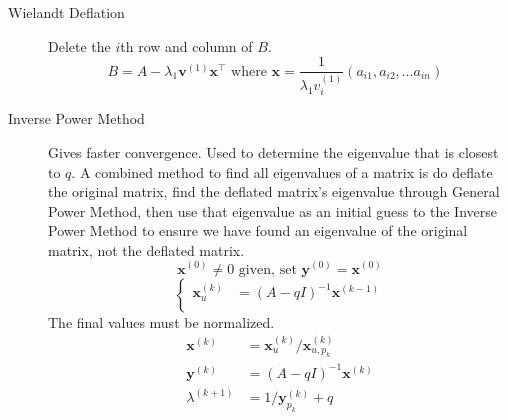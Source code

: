 \documentclass[8pt]{article}
\begin{document}
\begin{multicols}{2}
\begin{description}
  \item[Wielandt Deflation] Delete the $i$th row and column of $B$.
    \begin{equation*}
      B=A-\lambda_1\mathbf{v}^{(1)}\mathbf{x}^\top 
      \text{ where } \mathbf{x}=\frac{1}{\lambda_1 v^{(1)}_i}(a_{i1}, a_{i2}, \ldots a_{in}) 
      \text{ }
    \end{equation*}
  \item[Inverse Power Method] Gives faster convergence. Used to determine the eigenvalue that is
    closest to $q$. A combined method to find all eigenvalues of a matrix is do deflate the original
    matrix, find the deflated matrix's eigenvalue through General Power Method, then use that
    eigenvalue as an initial guess to the Inverse Power Method to ensure we have found an eigenvalue
    of the original matrix, not the deflated matrix.
    $$\mathbf{x}^{(0)} \neq 0 \text{ given, set } \mathbf{y}^{(0)}=\mathbf{x}^{(0)}$$
    \begin{equation*}
      \left\{
        \begin{aligned}
          \mathbf{x}^{(k)}_u &= (A-qI)^{-1}\mathbf{x}^{(k-1)} \\
        \end{aligned}
      \right.
    \end{equation*}
        The final values must be normalized.
    \begin{equation*}
        \begin{aligned}
          \mathbf{x}^{(k)} &= \mathbf{x}^{(k)}_u/\mathbf{x}^{(k)}_{u,p_k} \\
          \mathbf{y}^{(k)} &= (A-qI)^{-1}\mathbf{x}^{(k)} \\
          \lambda^{(k+1)} &= 1/\mathbf{y}^{(k)}_{p_k}+q \\
        \end{aligned}
    \end{equation*}


\end{description}
\end{multicols}
\end{document}

